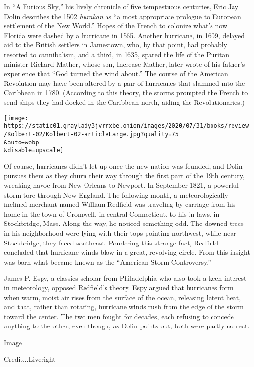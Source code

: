 In ``A Furious Sky,'' his lively chronicle of five tempestuous
centuries, Eric Jay Dolin describes the 1502 \emph{hurakan} as ``a most
appropriate prologue to European settlement of the New World.'' Hopes of
the French to colonize what's now Florida were dashed by a hurricane in
1565. Another hurricane, in 1609, delayed aid to the British settlers in
Jamestown, who, by that point, had probably resorted to cannibalism, and
a third, in 1635, spared the life of the Puritan minister Richard
Mather, whose son, Increase Mather, later wrote of his father's
experience that ``God turned the wind about.'' The course of the
American Revolution may have been altered by a pair of hurricanes that
slammed into the Caribbean in 1780. (According to this theory, the
storms prompted the French to send ships they had docked in the
Caribbean north, aiding the Revolutionaries.)

\texttt{[image: https://static01.graylady3jvrrxbe.onion/images/2020/07/31/books/review/Kolbert-02/Kolbert-02-articleLarge.jpg?quality=75\\\&auto=webp\\\&disable=upscale]}

Of course, hurricanes didn't let up once the new nation was founded, and
Dolin pursues them as they churn their way through the first part of the
19th century, wreaking havoc from New Orleans to Newport. In September
1821, a powerful storm tore through New England. The following month, a
meteorologically inclined merchant named William Redfield was traveling
by carriage from his home in the town of Cromwell, in central
Connecticut, to his in-laws, in Stockbridge, Mass. Along the way, he
noticed something odd. The downed trees in his neighborhood were lying
with their tops pointing northwest, while near Stockbridge, they faced
southeast. Pondering this strange fact, Redfield concluded that
hurricane winds blow in a great, revolving circle. From this insight was
born what became known as the ``American Storm Controversy.''

James P. Espy, a classics scholar from Philadelphia who also took a keen
interest in meteorology, opposed Redfield's theory. Espy argued that
hurricanes form when warm, moist air rises from the surface of the
ocean, releasing latent heat, and that, rather than rotating, hurricane
winds rush from the edge of the storm toward the center. The two men
fought for decades, each refusing to concede anything to the other, even
though, as Dolin points out, both were partly correct.

Image

Credit...Liveright

